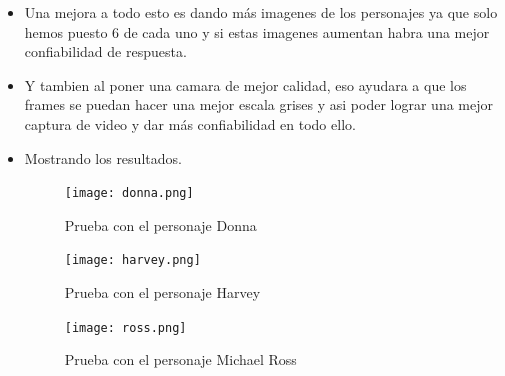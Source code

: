 \documentclass{vgtc}                          %
\begin{document}
\begin{itemize}
\item Una mejora a todo esto es dando más imagenes de los personajes ya que solo hemos puesto 6 de cada uno y si estas imagenes aumentan habra una mejor confiabilidad de respuesta.

\item Y tambien al poner una camara de mejor calidad, eso ayudara a que los frames se puedan hacer una mejor escala grises y asi poder lograr una mejor captura de video y dar más confiabilidad en todo ello.


\item Mostrando los resultados.

\begin{figure}[h]
	\centering
	\texttt{[image: donna.png]}
	\caption{Prueba con el personaje Donna}
\end{figure}


\begin{figure}[h]
	\centering
	\texttt{[image: harvey.png]}
	\caption{Prueba con el personaje Harvey}
\end{figure}

\begin{figure}[h]
	\centering
	\texttt{[image: ross.png]}
	\caption{Prueba con el personaje Michael Ross}
\end{figure}

\end{itemize}





\end{document}
